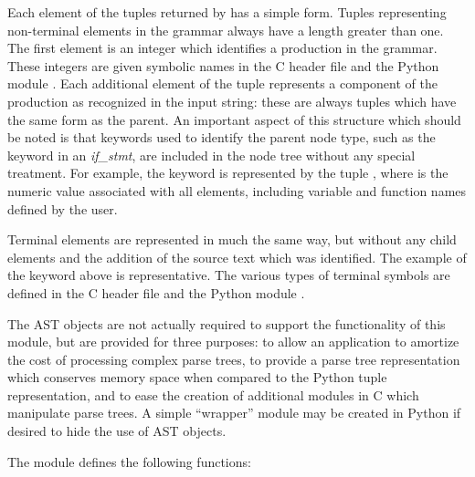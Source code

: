 Each element of the tuples returned by  has a simple
form.  Tuples representing non-terminal elements in the grammar always
have a length greater than one.  The first element is an integer which
identifies a production in the grammar.  These integers are given
symbolic names in the C header file  and the
Python module .  Each additional element of the
tuple represents a component of the production as recognized in the
input string: these are always tuples which have the same form as the
parent.  An important aspect of this structure which should be noted
is that keywords used to identify the parent node type, such as the
keyword  in an \emph{if\_stmt}, are included in the node tree
without any special treatment.  For example, the  keyword is
represented by the tuple , where  is the
numeric value associated with all  elements, including
variable and function names defined by the user.

Terminal elements are represented in much the same way, but without
any child elements and the addition of the source text which was
identified.  The example of the  keyword above is
representative.  The various types of terminal symbols are defined in
the C header file  and the Python module
.

The AST objects are not actually required to support the functionality
of this module, but are provided for three purposes: to allow an
application to amortize the cost of processing complex parse trees, to
provide a parse tree representation which conserves memory space when
compared to the Python tuple representation, and to ease the creation
of additional modules in C which manipulate parse trees.  A simple
``wrapper'' module may be created in Python if desired to hide the use
of AST objects.



The  module defines the following functions:


\renewcommand{\indexsubitem}{(in module parser)}


